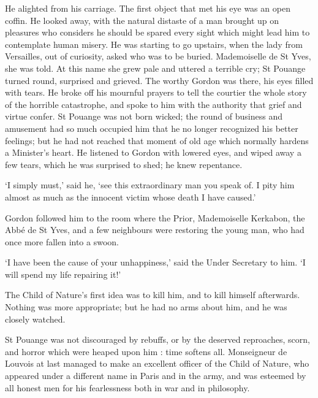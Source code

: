 \documentclass{article}
\begin{document}
\begin{center}
He alighted from his carriage. The first object that met his eye was an open coffin. 
He looked away, with the natural distaste of a man brought up on pleasures who 
considers he should be spared every sight which might lead him to contemplate human 
misery. He was starting to go upstairs, when the lady from Versailles, out of curiosity, 
asked who was to be buried. Mademoiselle de St Yves, she was told. At this name 
she grew pale and uttered a terrible cry; St Pouange turned round, surprised and 
grieved. The worthy Gordon was there, his eyes filled with tears. He broke off 
his mournful prayers to tell the courtier the whole story of the horrible catastrophe, 
and spoke to him with the authority that grief and virtue confer. St Pouange was 
not born wicked; the round of business and amusement had so much occupied him that 
he no longer recognized his better feelings; but he had not reached that moment 
of old age which normally hardens a Minister's heart. He listened to Gordon with 
lowered eyes, and wiped away a few tears, which he was surprised to shed; he knew 
repentance. 

`I simply must,' said he, `see this extraordinary man you speak of. I pity him 
almost as much as the innocent victim whose death I have caused.' 

Gordon followed him to the room where the Prior, Mademoiselle Kerkabon, the Abbé 
de St Yves, and a few neighbours were restoring the young man, who had once more 
fallen into a swoon. 

`I have been the cause of your unhappiness,' said the Under Secretary to him. `I 
will spend my life repairing it!' 

The Child of Nature's first idea was to kill him, and to kill himself afterwards. 
Nothing was more appropriate; but he had no arms about him, and he was closely 
watched. 

St Pouange was not discouraged by rebuffs, or by the deserved reproaches, scorn, 
and horror which were heaped upon him : time softens all. Monseigneur de Louvois 
at last managed to make an excellent officer of the Child of Nature, who appeared 
under a different name in Paris and in the army, and was esteemed by all honest 
men for his fearlessness both in war and in philosophy. 


\end{center}
\end{document}
